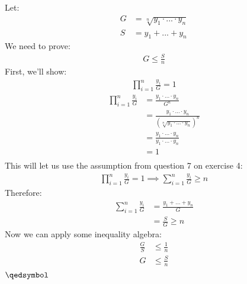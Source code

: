 \documentclass[a4paper, 12pt]{article}
\newcommand{\sub}[1]{\subsection{\underline{#1}}}
\newcommand{\eq}[1]{\begin{align*}#1\end{align*}}
\renewcommand{\qed}{\hfill\(\qedsymbol\)}
\begin{document}
\section{}
\sub{}
Let:
\eq{
    G&=\sqrt[n]{y_1\cdot...\cdot y_n}\\
    S&=y_1+...+y_n
}
We need to prove:
\eq{
    G\leq\frac{S}{n}
}
First, we'll show:
\eq{
    \prod^{n}_{i=1}\frac{y_i}{G}=1
}
\eq{
    \prod^{n}_{i=1}\frac{y_i}{G}&=\frac{y_1\cdot...\cdot y_n}{G^n}\\
    &=\frac{y_1\cdot...\cdot y_n}{(\sqrt[n]{y_1\cdot...\cdot y_n})^n}\\
    &=\frac{y_1\cdot...\cdot y_n}{y_1\cdot...\cdot y_n}\\
    &=1\\
}
This will let us use the assumption from question 7 on exercise 4:
\eq{
    \prod^{n}_{i=1}\frac{y_i}{G}=1 \implies \sum^{n}_{i=1}\frac{y_i}{G}\geq{n}
}
Therefore:
\eq{
    \sum^{n}_{i=1}\frac{y_i}{G}&=\frac{y_1+...+y_n}{G}\\
    &=\frac{S}{G}\geq{n}
}
Now we can apply some inequality algebra:
\eq{
    \frac{G}{S}&\leq\frac{1}{n}\\
    G&\leq\frac{S}{n}\\
}
\qed

\end{document}
